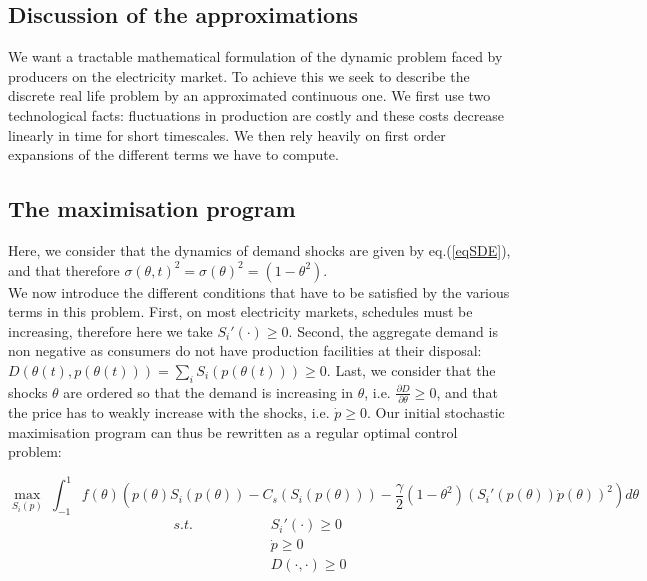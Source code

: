 \subsection{Discussion of the approximations}
We want a tractable mathematical formulation of the dynamic problem faced by producers on the electricity market. To achieve this we seek to describe the discrete real life problem by an approximated continuous one. We first use two technological facts: fluctuations in production are costly and these costs decrease linearly in time for short timescales. We then rely heavily on first order expansions of the different terms we have to compute.  

\subsection{The maximisation program}
Here, we consider that the dynamics of demand shocks are given by eq.(\ref{eqSDE}), and that therefore  $\sigma(\theta,t)^2=\sigma(\theta)^2=(1-\theta^2)$.\\

We now introduce the different conditions that have to be satisfied by the various terms in this problem. First, on most electricity markets, schedules must be increasing, therefore here we take $S_i'(\cdot)\geq0$. Second, the aggregate demand is non negative as consumers do not have production facilities at their disposal: $D(\theta(t),p(\theta(t)))=\sum_iS_i(p(\theta(t)))\geq0$. Last, we consider that the shocks $\theta$ are ordered so that the demand is increasing in $\theta$, i.e. $\frac{\partial D}{\partial\theta}\geq0$, and that the price has to weakly increase with the shocks, i.e. $\dot{p}\geq0$. Our initial stochastic maximisation program can thus be rewritten as a regular optimal control problem: 

\begin{equation}
\displaystyle{\max_{S_i(p)}}~\int_{-1}^{1} f(\theta)\left(p(\theta)S_i(p(\theta)) -C_s(S_i(p(\theta)))-\frac{\gamma}{2}(1-\theta^2)\left(S_i'(p(\theta))\dot{p}(\theta)\right)^2\right)d\theta
\end{equation}
\begin{eqnarray} 
s.t.\hspace{2cm}&S_i'(\cdot)\geq0 \nonumber\\
&\dot{p}\geq0\\
&D(\cdot,\cdot)\geq0 \nonumber\\
\end{eqnarray}

